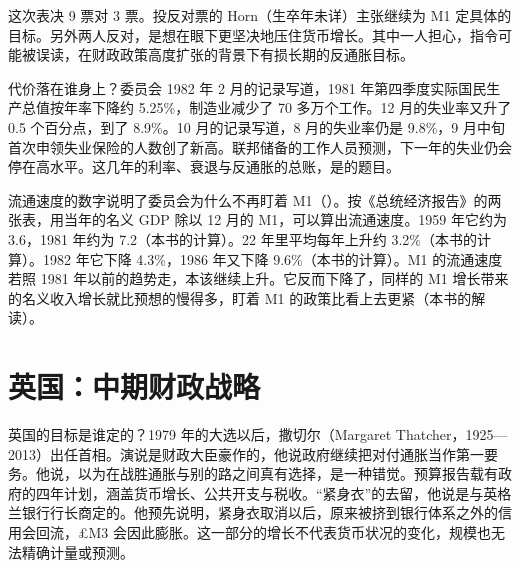 这次表决 9 票对 3 票\cite{fomc1982b}。投反对票的 Horn（生卒年未详）主张继续为 M1 定具体的目标\cite{fomc1982b}。另外两人反对，是想在眼下更坚决地压住货币增长\cite{fomc1982b}。其中一人担心，指令可能被误读，在财政政策高度扩张的背景下有损长期的反通胀目标\cite{fomc1982b}。

代价落在谁身上？委员会 1982 年 2 月的记录写道，1981 年第四季度实际国民生产总值按年率下降约 5.25\%，制造业减少了 70 多万个工作\cite{fomc1982a}。12 月的失业率又升了 0.5 个百分点，到了 8.9\%\cite{fomc1982a}。10 月的记录写道，8 月的失业率仍是 9.8\%，9 月中旬首次申领失业保险的人数创了新高\cite{fomc1982b}。联邦储备的工作人员预测，下一年的失业仍会停在高水平\cite{fomc1982b}。这几年的利率、衰退与反通胀的总账，是的题目。


流通速度的数字说明了委员会为什么不再盯着 M1（）。按《总统经济报告》的两张表，用当年的名义 GDP 除以 12 月的 M1，可以算出流通速度\cite{erp2000b}。1959 年它约为 3.6，1981 年约为 7.2（本书的计算）。22 年里平均每年上升约 3.2\%（本书的计算）。1982 年它下降 4.3\%，1986 年又下降 9.6\%（本书的计算）。M1 的流通速度若照 1981 年以前的趋势走，本该继续上升。它反而下降了，同样的 M1 增长带来的名义收入增长就比预想的慢得多，盯着 M1 的政策比看上去更紧（本书的解读）。

\section{英国：中期财政战略}\label{sec:monetarism-uk}

英国的目标是谁定的？1979 年的大选以后，撒切尔（Margaret Thatcher，1925—2013）出任首相\cite{loc45}。演说是财政大臣豪作的，他说政府继续把对付通胀当作第一要务\cite{hansard1980}。他说，以为在战胜通胀与别的路之间真有选择，是一种错觉\cite{hansard1980}。预算报告载有政府的四年计划，涵盖货币增长、公共开支与税收\cite{hansard1980}。“紧身衣”的去留，他说是与英格兰银行行长商定的\cite{hansard1980}。他预先说明，紧身衣取消以后，原来被挤到银行体系之外的信用会回流，£M3 会因此膨胀\cite{hansard1980}。这一部分的增长不代表货币状况的变化，规模也无法精确计量或预测\cite{hansard1980}。

